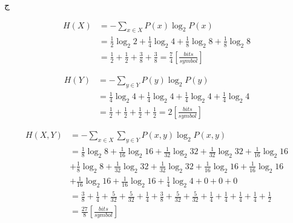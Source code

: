 \SubProblem
{ج}
{
\begin{equation*}
\begin{aligned}
    H(X)    &= -\sum_{x \in X} P(x) \log_2 {P(x)} \\ 
            &= \frac{1}{2}\log_2 2 + \frac{1}{4}\log_2 4 + \frac{1}{8}\log_2 8 + \frac{1}{8}\log_2 8 \\
            &= \frac{1}{2} + \frac{1}{2} + \frac{3}{8} + \frac{3}{8} = \frac{7}{4} [\frac{bits}{symbol}]
\end{aligned}
\end{equation*}
    
\begin{equation*}
\begin{aligned}
    H(Y)    &= -\sum_{y \in Y} P(y) \log_2 {P(y)} \\ 
            &= \frac{1}{4}\log_2 4 + \frac{1}{4}\log_2 4 + \frac{1}{4}\log_2 4 + \frac{1}{4}\log_2 4 \\
            &= \frac{1}{2} + \frac{1}{2} + \frac{1}{2} + \frac{1}{2} = 2 [\frac{bits}{symbol}]
\end{aligned}
\end{equation*}

\begin{equation*}
\begin{aligned}
    H(X,Y) &= -\sum_{x \in X}\sum_{y \in Y} P(x,y) \log_2 {P(x,y)} \\
    &= \frac{1}{8}\log_2 8 + \frac{1}{16}\log_2 16 + \frac{1}{32}\log_2 32 + \frac{1}{32}\log_2 32 + \frac{1}{16}\log_2 16 \\
    &+ \frac{1}{8}\log_2 8 + \frac{1}{32}\log_2 32 + \frac{1}{32}\log_2 32
    + \frac{1}{16}\log_2 16 + \frac{1}{16}\log_2 16 \\
    &+ \frac{1}{16}\log_2 16 + \frac{1}{16}\log_2 16 + \frac{1}{4}\log_2 4 + 0 + 0 + 0 \\
    &= \frac{3}{8} + \frac{1}{4} + \frac{5}{32} + \frac{5}{32}
    + \frac{1}{4} + \frac{3}{8} + \frac{5}{32} + \frac{5}{32} + \frac{1}{4} + \frac{1}{4} + \frac{1}{4} + \frac{1}{4} + \frac{1}{2} \\
    &= \frac{27}{8} [\frac{bits}{symbol}]
\end{aligned}
\end{equation*}
}